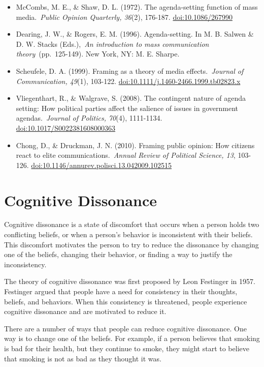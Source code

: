 \documentclass[
  b5paper]{book}
\begin{document}
\begin{itemize}
\item
  McCombs, M. E., \& Shaw, D. L. (1972). The agenda-setting function of mass media.~\emph{Public Opinion Quarterly, 36}(2), 176-187. \url{doi:10.1086/267990}
\item
  Dearing, J. W., \& Rogers, E. M. (1996). Agenda-setting. In M. B. Salwen \& D. W. Stacks (Eds.),~\emph{An introduction to mass communication theory}~(pp.~125-149). New York, NY: M. E. Sharpe.
\item
  Scheufele, D. A. (1999). Framing as a theory of media effects.~\emph{Journal of Communication, 49}(1), 103-122. \url{doi:10.1111/j.1460-2466.1999.tb02823.x}
\item
  Vliegenthart, R., \& Walgrave, S. (2008). The contingent nature of agenda setting: How political parties affect the salience of issues in government agendas.~\emph{Journal of Politics, 70}(4), 1111-1134. \url{doi:10.1017/S0022381608000363}
\item
  Chong, D., \& Druckman, J. N. (2010). Framing public opinion: How citizens react to elite communications.~\emph{Annual Review of Political Science, 13}, 103-126. \url{doi:10.1146/annurev.polisci.13.042009.102515}
\end{itemize}

\hypertarget{cognitive-dissonance}{%
\section{Cognitive Dissonance}\label{cognitive-dissonance}}

Cognitive dissonance is a state of discomfort that occurs when a person holds two conflicting beliefs, or when a person's behavior is inconsistent with their beliefs. This discomfort motivates the person to try to reduce the dissonance by changing one of the beliefs, changing their behavior, or finding a way to justify the inconsistency.

The theory of cognitive dissonance was first proposed by Leon Festinger in 1957. Festinger argued that people have a need for consistency in their thoughts, beliefs, and behaviors. When this consistency is threatened, people experience cognitive dissonance and are motivated to reduce it.

There are a number of ways that people can reduce cognitive dissonance. One way is to change one of the beliefs. For example, if a person believes that smoking is bad for their health, but they continue to smoke, they might start to believe that smoking is not as bad as they thought it was.
\end{document}
